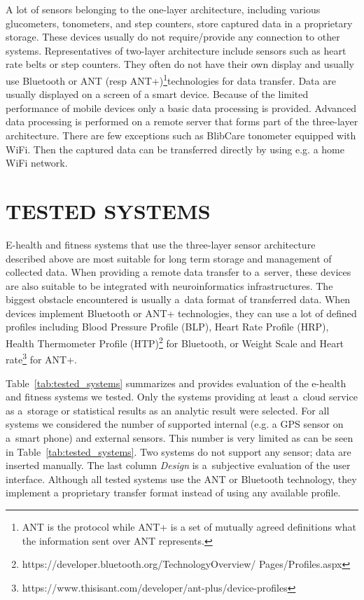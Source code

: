 \documentclass[a4paper,twoside]{article}
\begin{document}
 A lot of sensors belonging to the one-layer architecture, including various glucometers, tonometers, and step counters, store captured data in a proprietary storage. These devices usually do not require/provide any connection to other systems. Representatives of two-layer architecture include sensors such as heart rate belts or  step counters. They often do not have their own display and usually use Bluetooth or ANT (resp ANT+)\footnote{ANT is the protocol while ANT+ is a set of mutually agreed definitions what the information sent over ANT represents.}technologies  for data transfer. Data are usually displayed on a screen of a smart device. Because of the limited performance of mobile devices only a basic data processing is provided. Advanced data processing is performed on a remote server that forms part of the three-layer architecture. There are few exceptions such as BlibCare tonometer equipped with WiFi. Then the captured data can be transferred directly by using e.g. a home WiFi network.



\section{\uppercase{Tested systems}}
\label{tested_systems}
\noindent

E-health and fitness systems that use the three-layer sensor architecture described above are most suitable for long term storage and management of collected data. When providing a remote data transfer to a~server, these devices are also suitable to be integrated with neuroinformatics infrastructures. The biggest obstacle encountered is usually a~data format of transferred data. When devices implement Bluetooth or ANT+ technologies, they can use a lot of defined profiles including Blood Pressure Profile (BLP), Heart Rate Profile (HRP), Health Thermometer Profile (HTP)\footnote{https://developer.bluetooth.org/TechnologyOverview/ Pages/Profiles.aspx} for Bluetooth, or Weight Scale and Heart rate\footnote{https://www.thisisant.com/developer/ant-plus/device-profiles} for ANT+.

Table~\ref{tab:tested_systems} summarizes and provides evaluation of the e-health and fitness systems we tested. Only the systems providing at least a~cloud service as a~storage or statistical results as an analytic result were selected. For all systems we considered the number of supported internal (e.g. a GPS sensor on a~smart phone) and external sensors. This number is very limited as can be seen in Table~\ref{tab:tested_systems}. Two systems do not support any sensor; data are inserted manually. The last column \emph{Design} is a~subjective evaluation of the user interface. Although all tested systems use the ANT or Bluetooth technology, they implement a proprietary transfer format instead of using any available profile.
\end{document}
